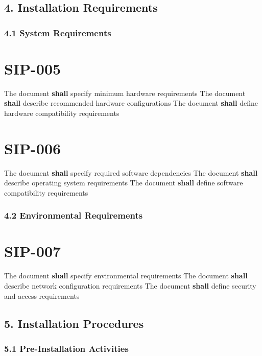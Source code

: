 \subsection{4. Installation Requirements}

\subsubsection{4.1 System Requirements}

\section{SIP-005}\label{SIP-005}

The document \textbf{shall} specify minimum hardware requirements
The document \textbf{shall} describe recommended hardware configurations
The document \textbf{shall} define hardware compatibility requirements

\section{SIP-006}\label{SIP-006}

The document \textbf{shall} specify required software dependencies
The document \textbf{shall} describe operating system requirements
The document \textbf{shall} define software compatibility requirements

\subsubsection{4.2 Environmental Requirements}

\section{SIP-007}\label{SIP-007}

The document \textbf{shall} specify environmental requirements
The document \textbf{shall} describe network configuration requirements
The document \textbf{shall} define security and access requirements

\subsection{5. Installation Procedures}

\subsubsection{5.1 Pre-Installation Activities}

